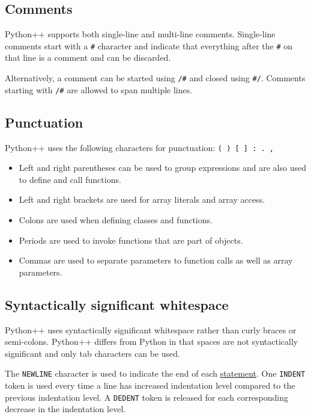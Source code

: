\documentclass{article}
\begin{document}
\subsection{Comments}
Python++ supports both single-line and multi-line comments. Single-line comments start with a \texttt{\#} character and indicate that everything after the \texttt{\#} on that line is a comment and can be discarded.

Alternatively, a comment can be started using \texttt{/\#} and closed using \texttt{\#/}. Comments starting with \texttt{/\#} are allowed to span multiple lines.

\subsection{Punctuation}
Python++ uses the following characters for punctuation: \texttt{( ) [ ] : . ,} \newline

\begin{itemize}
\item Left and right parentheses can be used to group expressions and are also used to define and call functions.

\item Left and right brackets are used for array literals and array access.

\item Colons are used when defining classes and functions.

\item Periods are used to invoke functions that are part of objects.

\item Commas are used to separate parameters to function calls as well as array parameters.
\end{itemize}

\subsection{Syntactically significant whitespace}
Python++ uses syntactically significant whitespace rather than curly braces or semi-colons. Python++ differs from Python in that spaces are not syntactically significant and only tab characters can be used.

The \texttt{NEWLINE} character is used to indicate the end of each \hyperref[sec:stmt]{statement}. One \texttt{INDENT} token is used every time a line has increased indentation level compared to the previous indentation level. A \texttt{DEDENT} token is released for each corresponding decrease in the indentation level. 
\end{document}
